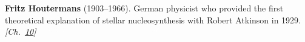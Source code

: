 \textbf{Fritz Houtermans} (1903–1966). German physicist who provided the first theoretical explanation of stellar nucleosynthesis with Robert Atkinson in 1929. \emph{[Ch.~\hyperref[ch:solarfusionquantumtunneling]{10}]}

